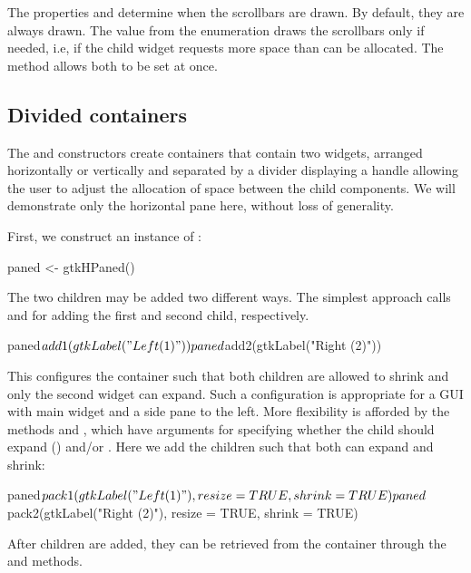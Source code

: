 The properties  and 
determine when the scrollbars are drawn. By default, they are always
drawn. The  value from the 
enumeration draws the scrollbars only if needed, i.e, if the child
widget requests more space than can be allocated. The
 method allows both to be set at
once.


\subsection{Divided containers}
\label{sec:RGtk2:gtkPanedWindow}

The  and  constructors
create containers that contain two widgets, arranged horizontally or
vertically and separated by a divider displaying a handle allowing the
user to adjust the allocation of space between the child
components. We will demonstrate only the horizontal pane
 here, without loss of generality.

First, we construct an instance of :
\begin{Schunk}
\begin{Sinput}
 paned <- gtkHPaned()
\end{Sinput}
\end{Schunk}

The two children may be added two different ways. The simplest
approach calls  and
 for adding the first and second child,
respectively. 
\begin{Schunk}
\begin{Sinput}
 paned$add1(gtkLabel("Left (1)"))
 paned$add2(gtkLabel("Right (2)"))
\end{Sinput}
\end{Schunk}
%
This configures the container such that both children are allowed to
shrink and only the second widget can expand. Such a configuration is
appropriate for a GUI with main widget and a side pane to the
left. More flexibility is afforded by the methods
 and , which have
arguments for specifying whether the child should expand
() and/or . Here we add the children such
that both can expand and shrink:
\begin{Schunk}
\begin{Sinput}
 paned$pack1(gtkLabel("Left (1)"), resize = TRUE, shrink = TRUE)
 paned$pack2(gtkLabel("Right (2)"), resize = TRUE, shrink = TRUE)
\end{Sinput}
\end{Schunk}
%
After children are added, they can be retrieved from the container
through the  and
 methods.

